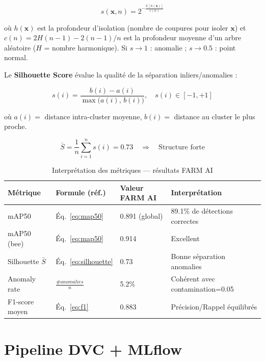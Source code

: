 \documentclass[12pt,a4paper,oneside]{report}
\begin{document}
\begin{equation}
s(\mathbf{x}, n) = 2^{-\frac{\mathbb{E}[h(\mathbf{x})]}{c(n)}}
\label{eq:isof}
\end{equation}

où $h(\mathbf{x})$ est la profondeur d'isolation (nombre de coupures pour isoler $\mathbf{x}$)
et $c(n) = 2H(n-1) - 2(n-1)/n$ est la profondeur moyenne d'un arbre aléatoire
($H$ = nombre harmonique). Si $s \to 1$ : anomalie ; $s \to 0.5$ : point normal.

Le \textbf{Silhouette Score} évalue la qualité de la séparation inliers/anomalies :

\begin{equation}
s(i) = \frac{b(i) - a(i)}{\max\bigl(a(i),\, b(i)\bigr)}, \quad s(i) \in [-1, +1]
\label{eq:silhouette}
\end{equation}

où $a(i) =$ distance intra-cluster moyenne, $b(i) =$ distance au cluster le plus proche.

\begin{equation}
\boxed{
\bar{S} = \frac{1}{n} \sum_{i=1}^n s(i) = 0.73 \quad \Rightarrow \quad \text{Structure forte}
}
\label{eq:sil_result}
\end{equation}

\begin{table}[H]\centering
\caption{Interprétation des métriques — résultats FARM AI}
\label{tab:metrics_interp}
\begin{tabular}{llll}
\toprule
\textbf{Métrique}&\textbf{Formule (réf.)}&\textbf{Valeur FARM AI}&\textbf{Interprétation}\\
\midrule
mAP50  & Éq.~\ref{eq:map50} & 0.891 (global) & 89.1\% de détections correctes \\
mAP50 (bee) & Éq.~\ref{eq:map50} & 0.914 & Excellent \\
Silhouette $\bar{S}$ & Éq.~\ref{eq:silhouette} & 0.73 & Bonne séparation anomalies \\
Anomaly rate & $\frac{\#anomalies}{n}$ & 5.2\% & Cohérent avec contamination=0.05 \\
F1-score moyen & Éq.~\ref{eq:f1} & 0.883 & Précision/Rappel équilibrés \\
\bottomrule
\end{tabular}
\end{table}

\section{Pipeline DVC + MLflow}
\end{document}
